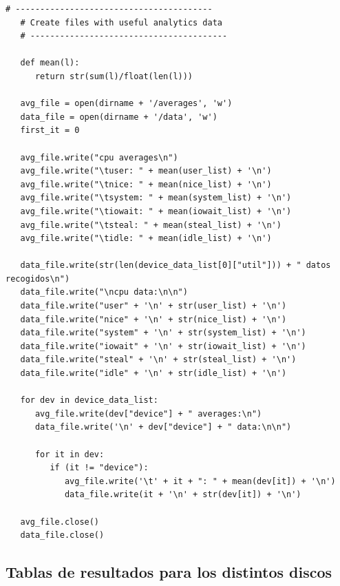 \documentclass[a4paper,10pt]{article}
\begin{document}
  \begin{lstlisting}[style=pystyle]
   # ----------------------------------------
   # Create files with useful analytics data   
   # ----------------------------------------
   
   def mean(l):
      return str(sum(l)/float(len(l))) 
   
   avg_file = open(dirname + '/averages', 'w')
   data_file = open(dirname + '/data', 'w')
   first_it = 0
   
   avg_file.write("cpu averages\n")
   avg_file.write("\tuser: " + mean(user_list) + '\n')
   avg_file.write("\tnice: " + mean(nice_list) + '\n')
   avg_file.write("\tsystem: " + mean(system_list) + '\n')
   avg_file.write("\tiowait: " + mean(iowait_list) + '\n')
   avg_file.write("\tsteal: " + mean(steal_list) + '\n')
   avg_file.write("\tidle: " + mean(idle_list) + '\n')
   
   data_file.write(str(len(device_data_list[0]["util"])) + " datos recogidos\n")
   data_file.write("\ncpu data:\n\n")
   data_file.write("user" + '\n' + str(user_list) + '\n')
   data_file.write("nice" + '\n' + str(nice_list) + '\n')
   data_file.write("system" + '\n' + str(system_list) + '\n')
   data_file.write("iowait" + '\n' + str(iowait_list) + '\n')
   data_file.write("steal" + '\n' + str(steal_list) + '\n')
   data_file.write("idle" + '\n' + str(idle_list) + '\n')

   for dev in device_data_list:
      avg_file.write(dev["device"] + " averages:\n")
      data_file.write('\n' + dev["device"] + " data:\n\n")
      
      for it in dev:            
         if (it != "device"):
            avg_file.write('\t' + it + ": " + mean(dev[it]) + '\n')		 
            data_file.write(it + '\n' + str(dev[it]) + '\n')

   avg_file.close()
   data_file.close()
  \end{lstlisting}
 \newpage
 \subsection*{Tablas de resultados para los distintos discos}
 \hypertarget{tablas}{}
 
  
\newpage
\printbibliography
\end{document}
